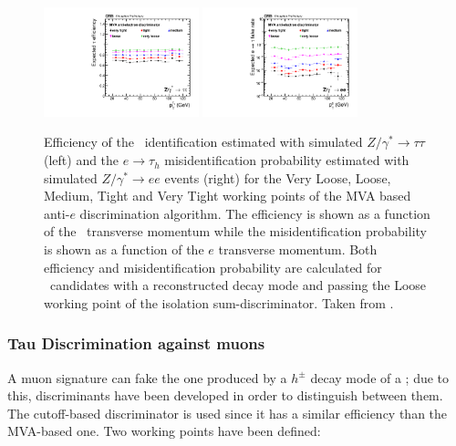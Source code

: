  \begin{figure}[ht]
   \begin{center}
     \includegraphics[width=0.4\textwidth]{figuras/Chapter3/TauEffAgainstElectrons}
     \includegraphics[width=0.4\textwidth]{figuras/Chapter3/FakeRateAgainstElectrons}
     \caption{
     Efficiency of the \tauh~identification estimated with simulated $Z/\gamma^{*}\rightarrow\tau\tau$ (left) 
      and the $e \rightarrow \tau_{h}$ misidentification probability estimated with simulated $Z/\gamma^{*}\rightarrow ee$ 
    events (right) for the Very Loose, Loose, Medium, Tight and Very Tight working points of the MVA based 
    anti-$e$ discrimination algorithm. The efficiency is shown as a function of the \tauh~transverse momentum 
    while the misidentification probability is shown as a function of the $e$ transverse momentum. Both 
    efficiency and misidentification probability are calculated for \tauh~candidates with a reconstructed 
    decay mode and passing the Loose working point of the isolation sum-discriminator. Taken from \cite{CMS-PAS-TAU-16-002}.
     }
     \label{fig:AgainstElectron}
   \end{center}
 \end{figure} 


\subsubsection{Tau Discrimination against muons}
\label{subsubsec:DiscriminatorsAgainstMuon}

\noindent A muon signature can fake the one produced by a $h^{\pm}$ decay mode 
of a \tauh; due to this, discriminants have been developed in order to 
distinguish between them. The cutoff-based discriminator
is used since it has a similar efficiency than the MVA-based one. Two 
working points have been defined:

